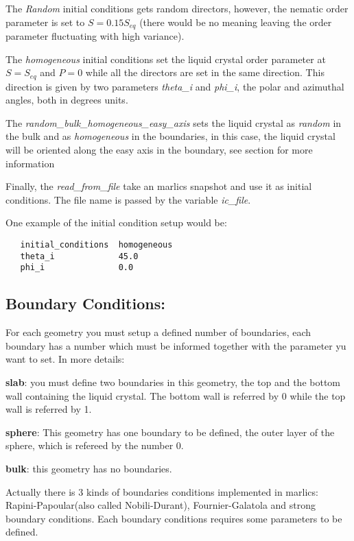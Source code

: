 \documentclass{article}
\begin{document}
The \textit{Random} initial conditions gets random directors, however,
the nematic order parameter is set to $S=0.15 S_{eq}$ (there would be
no meaning leaving the order parameter fluctuating with high
variance).

The \textit{homogeneous} initial conditions set the liquid crystal
order parameter at $S=S_{eq}$ and $P=0$ while all the directors are
set in the same direction. This direction is given by two parameters
\textit{theta_i} and \textit{phi_i}, the polar and azimuthal angles,
both in degrees units.

The \textit{random_bulk_homogeneous_easy_axis} sets the liquid crystal
as \textit{random} in the bulk and as \textit{homogeneous} in the
boundaries, in this case, the liquid crystal will be oriented along
the easy axis in the boundary, see section \label{ssec:boundary} for
more information

Finally, the \textit{read_from_file} take an marlics snapshot and use
it as initial conditions. The file name is passed by the variable
\textit{ic_file}.

One example of the initial condition setup would be:
\begin{lstlisting}
   initial_conditions  homogeneous
   theta_i             45.0
   phi_i               0.0	
\end{lstlisting}


\subsection{Boundary Conditions:}\label{boundary.params}

For each geometry you must setup a defined number of boundaries, each
boundary has a number which must be informed together with the
parameter yu want to set. In more details:

\textbf{slab}: you must define two boundaries in this geometry, the
top and the bottom wall containing the liquid crystal. The bottom wall
is referred by 0 while the top wall is referred by 1.

\textbf{sphere}: This geometry has one boundary to be defined, the
outer layer of the sphere, which is refereed by the number 0.

\textbf{bulk}: this geometry has no boundaries.

Actually there is 3 kinds of boundaries conditions implemented in
marlics: Rapini-Papoular(also called Nobili-Durant), Fournier-Galatola and strong
boundary conditions. Each boundary conditions requires some parameters
to be defined.
\end{document}
